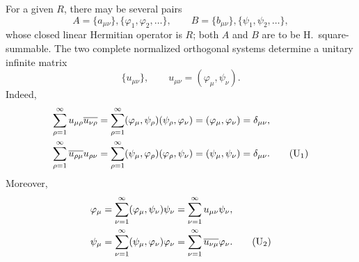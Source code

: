 ﻿\documentclass[paper=b5,fontsize=13pt,bookmarkpackage=false,twoside]{scrartcl}
\begin{document}
For a given \(R\), there may be several pairs
\[
  A=\{a_{\mu\nu}\},\{\varphi_1,\varphi_2,\ldots\},
  \qquad
  B=\{b_{\mu\nu}\},\{\psi_1,\psi_2,\ldots\},
\]
whose closed linear Hermitian operator is \(R\); both \(A\) and \(B\)
are to be H.\ square-summable.  The two complete normalized orthogonal
systems determine a unitary infinite matrix
\[
  \{u_{\mu\nu}\},\qquad u_{\mu\nu}=(\varphi_\mu,\psi_\nu).
\]
Indeed,
\begin{align}
 \sum_{\rho=1}^{\infty}u_{\mu\rho}\overline{u_{\nu\rho}}
 &=\sum_{\rho=1}^{\infty}
   (\varphi_\mu,\psi_\rho)(\psi_\rho,\varphi_\nu)
  =(\varphi_\mu,\varphi_\nu)=\delta_{\mu\nu},\notag\\
 \sum_{\rho=1}^{\infty}\overline{u_{\rho\mu}}u_{\rho\nu}
 &=\sum_{\rho=1}^{\infty}
   (\psi_\mu,\varphi_\rho)(\varphi_\rho,\psi_\nu)
  =(\psi_\mu,\psi_\nu)=\delta_{\mu\nu}.
 \tag{U\(_1\)}\label{eq:U1}
\end{align}
Moreover,
\begin{align}
  \varphi_\mu
  &=\sum_{\nu=1}^{\infty}(\varphi_\mu,\psi_\nu)\psi_\nu
   =\sum_{\nu=1}^{\infty}u_{\mu\nu}\psi_\nu,\notag\\
  \psi_\mu
  &=\sum_{\nu=1}^{\infty}(\psi_\mu,\varphi_\nu)\varphi_\nu
   =\sum_{\nu=1}^{\infty}\overline{u_{\nu\mu}}\varphi_\nu.
  \tag{U\(_2\)}\label{eq:U2}
\end{align}
\end{document}

